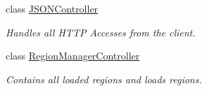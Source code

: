 \begin{DoxyCompactItemize}
class \hyperlink{classServer_1_1Controllers_1_1JSONController}{J\+S\+O\+N\+Controller}
\begin{DoxyCompactList}\small\item\em Handles all H\+T\+T\+P Accesses from the client. \end{DoxyCompactList}\item 
class \hyperlink{classServer_1_1Controllers_1_1RegionManagerController}{Region\+Manager\+Controller}
\begin{DoxyCompactList}\small\item\em Contains all loaded regions and loads regions. \end{DoxyCompactList}\end{DoxyCompactItemize}
